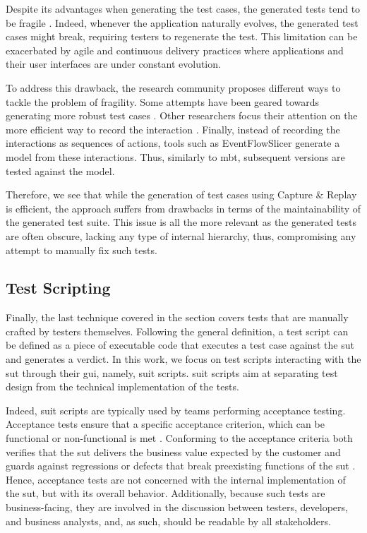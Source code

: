 Despite its advantages when generating the test cases, the generated tests tend to be fragile \cite{Hammoudi2016}. Indeed, whenever the application naturally evolves, the generated test cases might break, requiring testers to regenerate the test. This limitation can be exacerbated by agile and continuous delivery practices where applications and their user interfaces are under constant evolution.

To address this drawback, the research community proposes different ways to tackle the problem of fragility. Some attempts have been geared towards generating more robust test cases \cite{Hammoudi2016b}. Other researchers focus their attention on the more efficient way to record the interaction \cite{Ronsse1999}. Finally, instead of recording the interactions as sequences of actions, tools such as EventFlowSlicer \cite{Saddler2017} generate a model from these interactions. Thus, similarly to \gls{mbt}, subsequent versions are tested against the model.

Therefore, we see that while the generation of test cases using Capture \& Replay is efficient, the approach suffers from drawbacks in terms of the maintainability of the generated test suite. This issue is all the more relevant as the generated tests are often obscure, lacking any type of internal hierarchy, thus, compromising any attempt to manually fix such tests. 

\subsection{Test Scripting}
\label{sec:introduction-test-scripting}

Finally, the last technique covered in the section covers tests that are manually crafted by testers themselves. Following the general definition, a test script can be defined as a piece of executable code that executes a test case against the \gls{sut} and generates a verdict. In this work, we focus on test scripts interacting with the \gls{sut} through their \gls{gui}, namely, \gls{suit} scripts. \gls{suit} scripts aim at separating test design from the technical implementation of the tests.

Indeed, \gls{suit} scripts are typically used by teams performing acceptance testing. Acceptance tests ensure that a specific acceptance criterion, which can be functional or non-functional is met \cite{Pandit2015}. Conforming to the acceptance criteria both verifies that the \gls{sut} delivers the business value expected by the customer and guards against regressions or defects that break preexisting functions of the \gls{sut} \cite{Humble2010}. Hence, acceptance tests are not concerned with the internal implementation of the \gls{sut}, but with its overall behavior. Additionally, because such tests are business-facing, they are involved in the discussion between testers, developers, and business analysts, and, as such, should be readable by all stakeholders.

